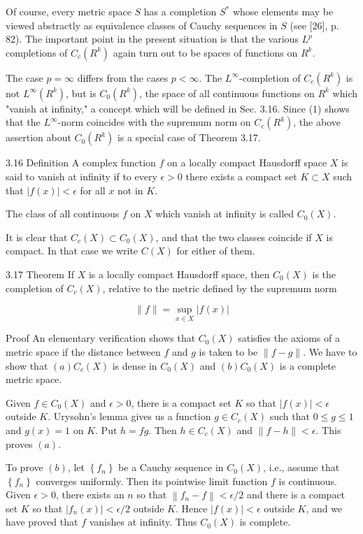 \documentclass[10pt]{article}
\begin{document}
Of course, every metric space $S$ has a completion $S^{*}$ whose elements may be viewed abstractly as equivalence classes of Cauchy sequences in $S$ (see [26], p. 82). The important point in the present situation is that the various $L^{p}$ completions of $C_{c}\left(R^{k}\right)$ again turn out to be spaces of functions on $R^{k}$.

The case $p=\infty$ differs from the cases $p<\infty$. The $L^{\infty}$-completion of $C_{c}\left(R^{k}\right)$ is not $L^{\infty}\left(R^{k}\right)$, but is $C_{0}\left(R^{k}\right)$, the space of all continuous functions on $R^{k}$ which "vanish at infinity," a concept which will be defined in Sec. 3.16. Since (1) shows that the $L^{\infty}$-norm coincides with the supremum norm on $C_{c}\left(R^{k}\right)$, the above assertion about $C_{0}\left(R^{k}\right)$ is a special case of Theorem 3.17.

3.16 Definition A complex function $f$ on a locally compact Hausdorff space $X$ is said to vanish at infinity if to every $\epsilon>0$ there exists a compact set $K \subset X$ such that $|f(x)|<\epsilon$ for all $x$ not in $K$.

The class of all continuous $f$ on $X$ which vanish at infinity is called $C_{0}(X)$.

It is clear that $C_{c}(X) \subset C_{0}(X)$, and that the two classes coincide if $X$ is compact. In that case we write $C(X)$ for either of them.

3.17 Theorem If $X$ is a locally compact Hausdorff space, then $C_{0}(X)$ is the completion of $C_{c}(X)$, relative to the metric defined by the supremum norm

$$
\|f\|=\sup _{x \in X}|f(x)|
$$

Proof An elementary verification shows that $C_{0}(X)$ satisfies the axioms of a metric space if the distance between $f$ and $g$ is taken to be $\|f-g\|$. We have to show that $(a) C_{c}(X)$ is dense in $C_{0}(X)$ and $(b) C_{0}(X)$ is a complete metric space.

Given $f \in C_{0}(X)$ and $\epsilon>0$, there is a compact set $K$ so that $|f(x)|<\epsilon$ outside $K$. Urysohn's lemma gives us a function $g \in C_{c}(X)$ such that $0 \leq g \leq 1$ and $g(x)=1$ on $K$. Put $h=f g$. Then $h \in C_{c}(X)$ and $\|f-h\|<\epsilon$. This proves $(a)$.

To prove $(b)$, let $\left\{f_{n}\right\}$ be a Cauchy sequence in $C_{0}(X)$, i.e., assume that $\left\{f_{n}\right\}$ converges uniformly. Then its pointwise limit function $f$ is continuous. Given $\epsilon>0$, there exists an $n$ so that $\left\|f_{n}-f\right\|<\epsilon / 2$ and there is a compact set $K$ so that $\left|f_{n}(x)\right|<\epsilon / 2$ outside $K$. Hence $|f(x)|<\epsilon$ outside $K$, and we have proved that $f$ vanishes at infinity. Thus $C_{0}(X)$ is complete.
\end{document}
